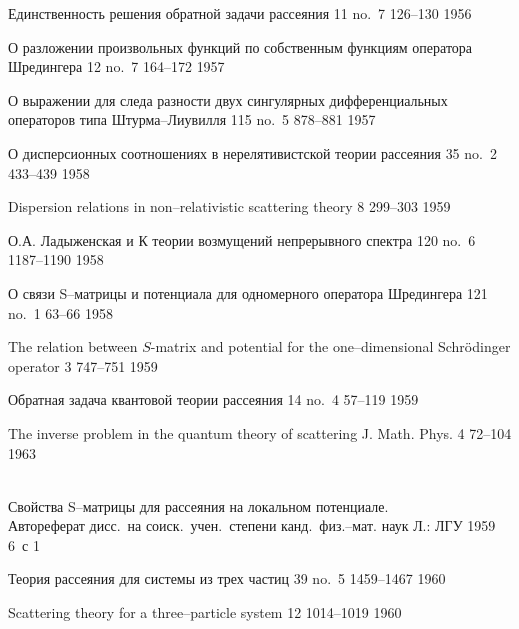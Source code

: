 {\LD} {Единственность решения обратной задачи
рассеяния} {\Vestnik} {11} {no.~7} {126--130} {1956}

{\LD}
{О разложении произвольных функций по собственным функциям оператора Шредингера}
{\Vestnik} {12}
  {no.~7} {164--172} {1957}

{\LD}
{О выражении для следа разности двух сингулярных
дифференциальных операторов типа Штурма--Лиувилля}
{\DAN} {115} {no.~5} {878--881} {1957}

{\LD}
{О дисперсионных соотношениях в нерелятивистской теории рассеяния}
{\ZETF} {35} {no.~2} {433--439} {1958}

{\LF}
{Dispersion relations in non--relativistic scattering theory}
{\JETP} {8} {299--303} {1959}

 {О.А. Ладыженская и \LD} {К теории возмущений непрерывного
спектра} {\DAN} {120} {no.~6} {1187--1190} {1958}

{\LD}
{О связи S--матрицы и потенциала для одномерного оператора Шредингера}
{\DAN} {121} {no.~1} {63--66} {1958}

{\LF}
{The relation between $S$-matrix and potential for the
  one--dimensional Schr\"odinger operator}
{\SPD} {3} {747--751} {1959}

{\LD}
{Обратная задача квантовой теории рассеяния}
{\UMN} {14} {no.~4} {57--119} {1959}

{\LF}
{The inverse problem in the quantum theory of scattering}
{J. Math. Phys.} {4} {72--104} {1963}

{\LD} \\
{Свойства S--матрицы для рассеяния на локальном потенциале.}\\
{Автореферат дисс.\ на соиск.\ учен.\ степени канд.\ физ.--мат. наук}
{Л.: ЛГУ} {} {1959} {} {6~с} {1}

{\LD}
{Теория рассеяния для системы из трех частиц}
{\ZETF} {39} {no.~5} {1459--1467} {1960}

{\LF}
{Scattering theory for a three--particle system}
{\JETP} {12} {1014--1019} {1960}

